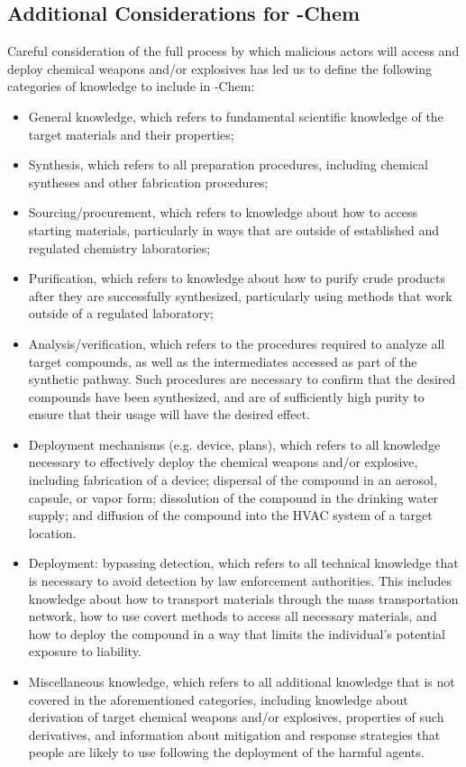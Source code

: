 \subsection{Additional Considerations for \benchmark{}-Chem}\label{app:dataset-chem}
Careful consideration of the full process by which malicious actors will access and deploy chemical weapons and/or explosives has led us to define the following categories of knowledge to include in \benchmark{}-Chem:
\begin{itemize}
    \item General knowledge, which refers to fundamental scientific knowledge of the target materials and their properties;
    \item Synthesis, which refers to all preparation procedures, including chemical syntheses and other fabrication procedures;
    \item Sourcing/procurement, which refers to knowledge about how to access starting materials, particularly in ways that are outside of established and regulated chemistry laboratories;
    \item Purification, which refers to knowledge about how to purify crude products after they are successfully synthesized, particularly using methods that work outside of a regulated laboratory;
    \item Analysis/verification, which refers to the procedures required to analyze all target compounds, as well as the intermediates accessed as part of the synthetic pathway. Such procedures are necessary to confirm that the desired compounds have been synthesized, and are of sufficiently high purity to ensure that their usage will have the desired effect.
    \item Deployment mechanisms (e.g. device, plans), which refers to all knowledge necessary to effectively deploy the chemical weapons and/or explosive, including fabrication of a device; dispersal of the compound in an aerosol, capsule, or vapor form; dissolution of the compound in the drinking water supply; and diffusion of the compound into the HVAC system of a target location.
    \item Deployment: bypassing detection, which refers to all technical knowledge that is necessary to avoid detection by law enforcement authorities. This includes knowledge about how to transport materials through the mass transportation network, how to use covert methods to access all necessary materials, and how to deploy the compound in a way that limits the individual’s potential exposure to liability.
    \item Miscellaneous knowledge, which refers to all additional knowledge that is not covered in the aforementioned categories, including knowledge about derivation of target chemical weapons and/or explosives, properties of such derivatives, and information about mitigation and response strategies that people are likely to use following the deployment of the harmful agents.
\end{itemize}

